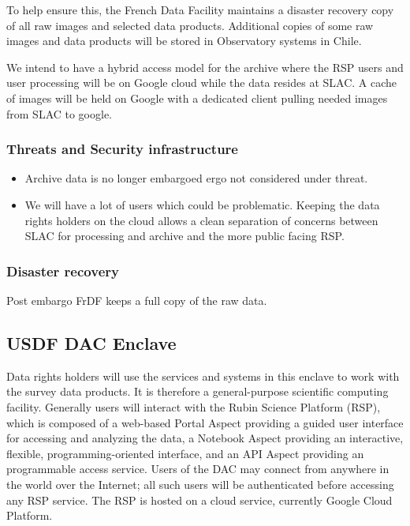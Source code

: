 To help ensure this, the French Data Facility maintains a disaster recovery copy of all raw images and selected data products. Additional copies of some raw images and data products will be stored in Observatory systems in Chile.

We intend to have a hybrid access model for the archive where  the \gls{RSP} users and user processing will be on Google cloud while the data resides at SLAC. A cache of images will be held on Google with a dedicated client pulling needed images from SLAC to google.


\subsubsection{ Threats and Security infrastructure}

\begin{itemize}
\item Archive data is no longer embargoed ergo not considered under threat.
\item We will have a lot of users which could be problematic. Keeping the data rights holders on the cloud allows a clean separation of concerns between SLAC for processing and archive and the more public facing \gls{RSP}.
\end{itemize}
\subsubsection{Disaster recovery}
Post embargo FrDF keeps a full copy of the raw data.



\subsection{ USDF \gls{DAC} Enclave}
Data rights holders will use the services and systems in this enclave to work with the survey data products.
It is therefore a general-purpose scientific computing facility. Generally users will interact with the Rubin Science Platform (\gls{RSP}), which is composed of a web-based Portal Aspect providing a guided user interface for accessing and analyzing the data, a Notebook Aspect providing an interactive, flexible, programming-oriented interface, and an API Aspect providing an programmable access service.
Users of the DAC may connect from anywhere in the world over the Internet; all such users will be authenticated before accessing any \gls{RSP} service.
The \gls{RSP} is hosted on a cloud service, currently  Google Cloud Platform.

